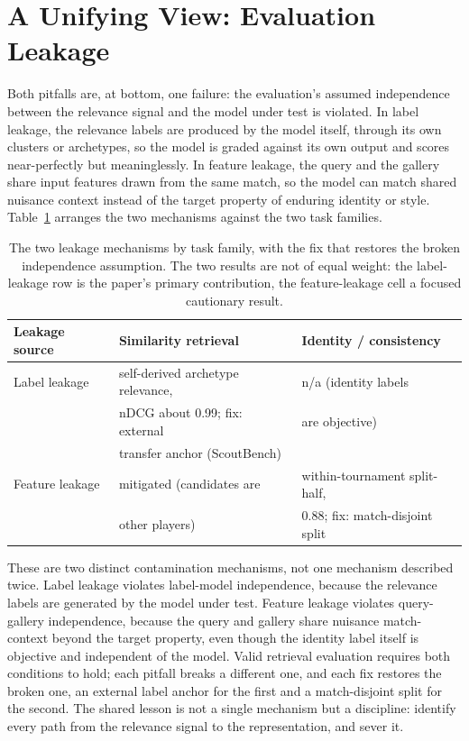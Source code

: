 \section{A Unifying View: Evaluation Leakage}
\label{sec:unifying}

Both pitfalls are, at bottom, one failure: the evaluation's assumed
independence between the relevance signal and the model under test is
violated. In label leakage, the relevance labels are produced by the model
itself, through its own clusters or archetypes, so the model is graded against
its own output and scores near-perfectly but meaninglessly. In feature
leakage, the query and the gallery share input features drawn from the same
match, so the model can match shared nuisance context instead of the target
property of enduring identity or style. Table~\ref{tab:twobytwo} arranges the
two mechanisms against the two task families.

\begin{table}[t]
\centering
\caption{The two leakage mechanisms by task family, with the fix that restores
the broken independence assumption. The two results are not of equal weight:
the label-leakage row is the paper's primary contribution, the feature-leakage
cell a focused cautionary result.}
\label{tab:twobytwo}
\begin{tabular}{lll}
\toprule
Leakage source & Similarity retrieval & Identity / consistency \\
\midrule
Label leakage & self-derived archetype relevance, & n/a (identity labels \\
              & nDCG about 0.99; fix: external & are objective) \\
              & transfer anchor (ScoutBench) & \\
\addlinespace
Feature leakage & mitigated (candidates are & within-tournament split-half, \\
                & other players) & 0.88; fix: match-disjoint split \\
\bottomrule
\end{tabular}
\end{table}

These are two distinct contamination mechanisms, not one mechanism described
twice. Label leakage violates label-model independence, because the relevance
labels are generated by the model under test. Feature leakage violates
query-gallery independence, because the query and gallery share nuisance
match-context beyond the target property, even though the identity label
itself is objective and independent of the model. Valid retrieval evaluation
requires both conditions to hold; each pitfall breaks a different one, and
each fix restores the broken one, an external label anchor for the first and a
match-disjoint split for the second. The shared lesson is not a single
mechanism but a discipline: identify every path from the relevance signal to
the representation, and sever it.

